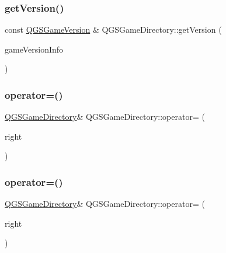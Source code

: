 \subsubsection{\texorpdfstring{get\+Version()}{getVersion()}\hspace{0.1cm}{\footnotesize\ttfamily [2/2]}}
{\footnotesize\ttfamily const \mbox{\hyperlink{class_q_g_s_game_version}{Q\+G\+S\+Game\+Version}} \& Q\+G\+S\+Game\+Directory\+::get\+Version (\begin{DoxyParamCaption}\item[{const \mbox{\hyperlink{class_q_g_s_game_version_info}{Q\+G\+S\+Game\+Version\+Info}} \&}]{game\+Version\+Info }\end{DoxyParamCaption})}

\mbox{\label{class_q_g_s_game_directory_a92a8780e4e1a28b379c1056427a28188}} 
\subsubsection{\texorpdfstring{operator=()}{operator=()}\hspace{0.1cm}{\footnotesize\ttfamily [1/2]}}
{\footnotesize\ttfamily \mbox{\hyperlink{class_q_g_s_game_directory}{Q\+G\+S\+Game\+Directory}}\& Q\+G\+S\+Game\+Directory\+::operator= (\begin{DoxyParamCaption}\item[{const \mbox{\hyperlink{class_q_g_s_game_directory}{Q\+G\+S\+Game\+Directory}} \&}]{right }\end{DoxyParamCaption})\hspace{0.3cm}{\ttfamily [default]}}

\mbox{\label{class_q_g_s_game_directory_a1dfa3ea4aef78249e2e13f0dda8087dc}} 
\subsubsection{\texorpdfstring{operator=()}{operator=()}\hspace{0.1cm}{\footnotesize\ttfamily [2/2]}}
{\footnotesize\ttfamily \mbox{\hyperlink{class_q_g_s_game_directory}{Q\+G\+S\+Game\+Directory}}\& Q\+G\+S\+Game\+Directory\+::operator= (\begin{DoxyParamCaption}\item[{\mbox{\hyperlink{class_q_g_s_game_directory}{Q\+G\+S\+Game\+Directory}} \&\&}]{right }\end{DoxyParamCaption})\hspace{0.3cm}{\ttfamily [default]}}

